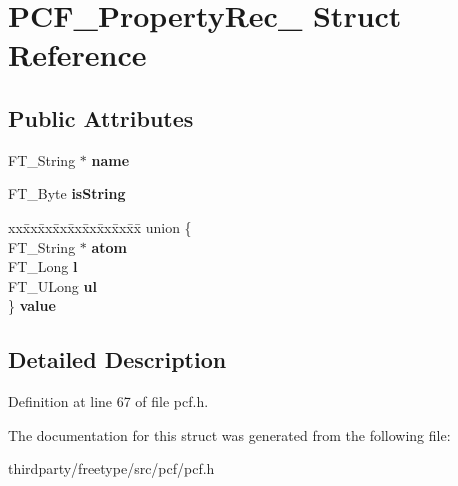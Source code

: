 \hypertarget{struct_p_c_f___property_rec__}{}\section{P\+C\+F\+\_\+\+Property\+Rec\+\_\+ Struct Reference}
\label{struct_p_c_f___property_rec__}
\subsection*{Public Attributes}
\begin{DoxyCompactItemize}
\item 
\mbox{\label{struct_p_c_f___property_rec___aa5a3016c8149cbe48b246ffd670c3f5b}} 
F\+T\+\_\+\+String $\ast$ {\bfseries name}
\item 
\mbox{\label{struct_p_c_f___property_rec___aa68a1298c3f359638fce955bf6662ee0}} 
F\+T\+\_\+\+Byte {\bfseries is\+String}
\item 
\mbox{\label{struct_p_c_f___property_rec___a1adeed469119f912643713df3acecb80}} 
\begin{tabbing}
xx\=xx\=xx\=xx\=xx\=xx\=xx\=xx\=xx\=\kill
union \{\\
\>FT\_String $\ast$ {\bfseries atom}\\
\>FT\_Long {\bfseries l}\\
\>FT\_ULong {\bfseries ul}\\
\} {\bfseries value}\\

\end{tabbing}\end{DoxyCompactItemize}


\subsection{Detailed Description}


Definition at line 67 of file pcf.\+h.



The documentation for this struct was generated from the following file\+:\begin{DoxyCompactItemize}
\item 
thirdparty/freetype/src/pcf/pcf.\+h\end{DoxyCompactItemize}
